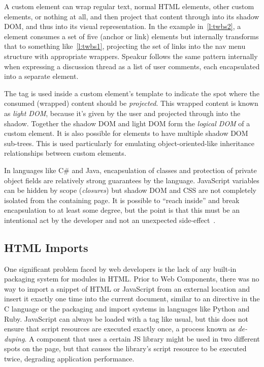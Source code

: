 A custom element can wrap regular text, normal HTML elements, other custom elements, or nothing at all,
and then project that content through into its shadow DOM, 
and thus into its visual representation.
In the example in~\cref{l:twbs2}, 
a \textbf{} element consumes a set of five 
\textbf{} (anchor or link) elements but internally transforms that to something like~\cref{l:twbs1}, 
projecting the set of links into the nav menu structure with appropriate wrappers.
Speakur follows the same pattern internally when expressing a discussion thread as a list of user comments, each encapsulated into a separate element.

The  tag is used inside a custom element's template to indicate the spot where the consumed (wrapped) content should be \textit{projected}. 
This wrapped content is known as 
\textit{light DOM}, 
because it's given by the user and projected through into the shadow.
Together the shadow DOM and light DOM form the \textit{logical DOM} of a custom element.
It is also possible for elements to have multiple shadow DOM sub-trees. 
This is used particularly for emulating object-oriented-like inheritance relationships between custom elements.

In languages like C\# and Java, encapsulation of classes and protection of private object fields are relatively strong guarantees by the language.
JavaScript variables can be hidden by scope (\textit{closures})
but shadow DOM and CSS are not completely isolated from the containing page.
It is possible to ``reach inside'' and break encapsulation to at least some degree, 
but the point is that this must be an intentional act by the developer and not an unexpected side-effect~\cite{bidelman2014}.

\subsection{HTML Imports}
One significant problem faced by web developers is the lack of any built-in packaging system for modules in HTML.
Prior to Web Components, there was no way to import a snippet of HTML or JavaScript from an external location and insert it exactly one time into the current document, 
similar to an  directive in the C language or the packaging and import systems in languages
like Python and Ruby. 
JavaScript can always be loaded with a  tag like usual, but this does not ensure that script resources are executed exactly once, a process known as \textit{de-duping}.
A component that uses a certain JS library might be used in two different spots on the page, 
but that causes the library's script resource to be executed twice, degrading application performance.

